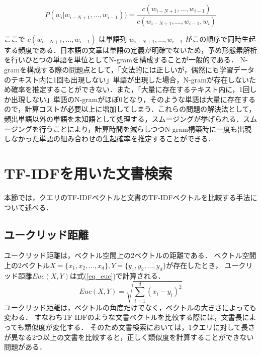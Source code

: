 \begin{equation}
    P(w_i|w_{i-N+1}, ..., w_{i-1})) = \frac{ c(w_{i-N+1}, ..., w_{i-1}) }{ c(w_{i-N+1}, ..., w_{i-1}, w_i) }  
    \label{onkyo_model2}
\end{equation}

ここで $c(w_{i-N+1}, ..., w_{i-1})$ は単語列 $w_{i-N+1}, ..., w_{i-1}$ がこの順序で同時生起する頻度である．日本語の文章は単語の定義が明確でないため，予め形態素解析を行いひとつの単語を単位としてN-gramを構成することが一般的である． 
N-gramを構成する際の問題点として，「文法的には正しいが，偶然にも学習データのテキスト内に1回も出現しない」単語が出現した場合，N-gramが存在しないため確率を推定することができない．また，「大量に存在するテキスト内に，1回しか出現しない」単語のN-gramがほぼ0となり，そのような単語は大量に存在するので，計算コストが必要以上に増加してしまう．これらの問題の解決法として，頻出単語以外の単語を未知語として処理する，スムージングが挙げられる．スムージング\cite{ngram_smooth1}を行うことにより，計算時間を減らしつつN-gram構築時に一度も出現しなかった単語の組み合わせの生起確率を推定することができる．

%
%


\section{TF-IDFを用いた文書検索} \label{sec_tfidf}
本節では，クエリのTF-IDFベクトルと文書のTF-IDFベクトルを比較する手法について述べる．
\subsection{ユークリッド距離}
ユークリッド距離は，ベクトル空間上の2ベクトルの距離である．
ベクトル空間上の2ベクトル$X = \{x_1, x_2, ..., x_d\}, Y = \{y_1, y_2, ..., y_d\}$が存在したとき，
ユークリッド距離$Euc(X, Y)$は式(\ref{eq_euc})で計算される．
\begin{equation}
    Euc(X, Y) = \sqrt{\sum^{d}_{i=1}{(x_i - y_i)^2}}    \label{eq_euc}
\end{equation}
ユークリッド距離は，ベクトルの角度だけでなく，ベクトルの大きさによっても変わる．
すなわちTF-IDFのような文書ベクトルを比較する際には，文書長によっても類似度が変化する．
そのため文書検索においては，1クエリに対して長さが異なる2つ以上の文書を比較すると，正しく類似度を計算することができない問題がある．

